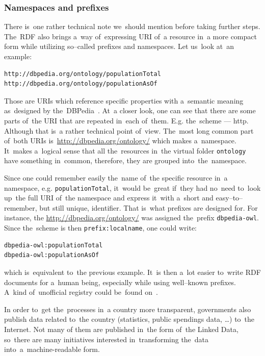 \subsubsection{Namespaces and prefixes}

There is~one rather technical note we~should mention before taking further steps. The~RDF
also brings a~way of~expressing URI of~a resource in~a more compact form while utilizing
so--called prefixes and namespaces. Let us~look at~an example:

\scriptsize\begin{verbatim}
http://dbpedia.org/ontology/populationTotal
http://dbpedia.org/ontology/populationAsOf
\end{verbatim}\normalsize

Those are URIs which reference specific properties with a~semantic meaning as~designed
by the~DBPedia~\cite{dbpedia}. At~a closer look, one can see that there are some parts of~the URI
that are repeated in~each of~them. E.g. the~scheme --- http. Although that is~a rather technical
point of~view. The~most long common part of~both URIs is~\url{http://dbpedia.org/ontology/}
which makes a~namespace. It~makes a~logical sense that all the~resources in~the virtual
folder \texttt{ontology} have something in~common, therefore, they are grouped into~the~namespace.

Since one could remember easily the~name of~the specific resource in~a namespace,
e.g. \texttt{populationTotal}, it~would be~great if~they had no~need to~look up~the full
URI of~the namespace and express it~with a~short and easy--to--remember, but still 
unique, identifier. That is~what prefixes are designed for. For instance, the
\url{http://dbpedia.org/ontology/} was assigned the~prefix \texttt{dbpedia-owl}. Since the~scheme
is then \texttt{prefix:localname}, one could write:

\scriptsize\begin{verbatim}
dbpedia-owl:populationTotal
dbpedia-owl:populationAsOf
\end{verbatim}\normalsize

which is~equivalent to~the previous example. It~is then a~lot easier to~write RDF
documents for a~human being, especially while using well--known prefixes. A~kind of~unofficial
registry could be~found on~\cite{prefixcc}.

In order to~get the~processes in~a country more transparent, governments also publish data
related to~the country (statistics, public spendings data, …) to~the Internet. Not many of
them are published in~the form of~the Linked Data, so~there are many initiatives
interested in~transforming the~data into~a~machine-readable form.

